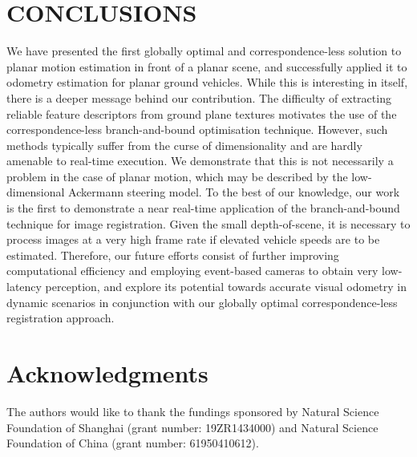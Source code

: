 \documentclass[letterpaper, 10 pt, conference]{ieeeconf}  %
\begin{document}

\section{CONCLUSIONS}

We have presented the first globally optimal and correspondence-less solution to planar motion estimation in front of a planar scene, and successfully applied it to odometry estimation for planar ground vehicles. While this is interesting in itself, there is a deeper message behind our contribution. The difficulty of extracting reliable feature descriptors from ground plane textures motivates the use of the correspondence-less branch-and-bound optimisation technique. However, such methods typically suffer from the curse of dimensionality and are hardly amenable to real-time execution. We demonstrate that this is not necessarily a problem in the case of planar motion, which may be described by the low-dimensional Ackermann steering model. To the best of our knowledge, our work is the first to demonstrate a near real-time application of the branch-and-bound technique for image registration. Given the small depth-of-scene, it is necessary to process images at a very high frame rate if elevated vehicle speeds are to be estimated. Therefore, our future efforts consist of further improving computational efficiency and employing event-based cameras to obtain very low-latency perception, and explore its potential towards accurate visual odometry in dynamic scenarios in conjunction with our globally optimal correspondence-less registration approach.


\section*{Acknowledgments}

The authors would like to thank the fundings sponsored by Natural Science Foundation of Shanghai (grant number: 19ZR1434000) and Natural Science Foundation of China (grant number: 61950410612).


\addtolength{\textheight}{-5.9cm} %
\end{document}

